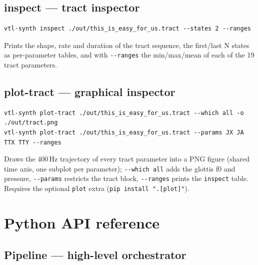 \documentclass[11pt,a4paper]{article}
\begin{document}
\subsection{inspect --- tract inspector}

\begin{lstlisting}[style=shell]
vtl-synth inspect ./out/this_is_easy_for_us.tract --states 2 --ranges
\end{lstlisting}

Prints the shape, rate and duration of the tract sequence, the first/last
N states as per-parameter tables, and with \texttt{-{}-ranges} the
min/max/mean of each of the 19 tract parameters.

\subsection{plot-tract --- graphical inspector}

\begin{lstlisting}[style=shell]
vtl-synth plot-tract ./out/this_is_easy_for_us.tract --which all -o ./out/tract.png
vtl-synth plot-tract ./out/this_is_easy_for_us.tract --params JX JA TTX TTY --ranges
\end{lstlisting}

Draws the 400\,Hz trajectory of every tract parameter into a PNG figure
(shared time axis, one subplot per parameter); \texttt{-{}-which all} adds
the glottis f0 and pressure, \texttt{-{}-params} restricts the tract
block, \texttt{-{}-ranges} prints the \texttt{inspect} table. Requires
the optional \texttt{plot} extra (\texttt{pip install ".[plot]"}).

\section{Python API reference}\label{sec:api}

\subsection{Pipeline --- high-level orchestrator}
\end{document}
